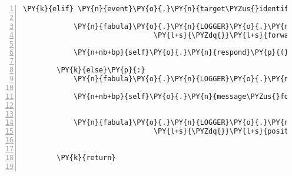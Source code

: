 \begin{Verbatim}[commandchars=\\\{\},numbers=left,firstnumber=1,stepnumber=1]
        \PY{k}{elif} \PY{n}{event}\PY{o}{.}\PY{n}{target\PYZus{}identifier} \PY{o+ow}{in} \PY{n+nb+bp}{self}\PY{o}{.}\PY{n}{host}\PY{o}{.}\PY{n}{rack}\PY{o}{.}\PY{n}{owner\PYZus{}dict}\PY{o}{.}\PY{n}{keys}\PY{p}{(}\PY{p}{)}\PY{p}{:}

            \PY{n}{fabula}\PY{o}{.}\PY{n}{LOGGER}\PY{o}{.}\PY{n}{info}\PY{p}{(}\PY{l+s}{\PYZdq{}}\PY{l+s}{\PYZsq{}}\PY{l+s}{\PYZob{}\PYZcb{}}\PY{l+s}{\PYZsq{}}\PY{l+s}{ dropped on Entity in rack }\PY{l+s}{\PYZsq{}}\PY{l+s}{\PYZob{}\PYZcb{}}\PY{l+s}{\PYZsq{}}\PY{l+s}{,}\PY{l+s}{\PYZdq{}}
                               \PY{l+s}{\PYZdq{}}\PY{l+s}{forwarding to respond()}\PY{l+s}{\PYZdq{}}\PY{o}{.}\PY{n}{format}\PY{p}{(}\PY{n}{event}\PY{o}{.}\PY{n}{item\PYZus{}identifier}\PY{p}{,}
                                                                \PY{n}{event}\PY{o}{.}\PY{n}{target\PYZus{}identifier}\PY{p}{)}\PY{p}{)}
            \PY{n+nb+bp}{self}\PY{o}{.}\PY{n}{respond}\PY{p}{(}\PY{n}{event}\PY{p}{)}

        \PY{k}{else}\PY{p}{:}
            \PY{n}{fabula}\PY{o}{.}\PY{n}{LOGGER}\PY{o}{.}\PY{n}{debug}\PY{p}{(}\PY{l+s}{\PYZdq{}}\PY{l+s}{target }\PY{l+s}{\PYZsq{}}\PY{l+s}{\PYZob{}\PYZcb{}}\PY{l+s}{\PYZsq{}}\PY{l+s}{ is not an entity identifier}\PY{l+s}{\PYZdq{}}\PY{o}{.}\PY{n}{format}\PY{p}{(}\PY{n}{event}\PY{o}{.}\PY{n}{target\PYZus{}identifier}\PY{p}{[}\PY{p}{:}\PY{l+m+mi}{2}\PY{p}{]}\PY{p}{)}\PY{p}{)}

            \PY{n+nb+bp}{self}\PY{o}{.}\PY{n}{message\PYZus{}for\PYZus{}host}\PY{o}{.}\PY{n}{event\PYZus{}list}\PY{o}{.}\PY{n}{append}\PY{p}{(}\PY{n}{fabula}\PY{o}{.}\PY{n}{PerceptionEvent}\PY{p}{(}\PY{n}{event}\PY{o}{.}\PY{n}{identifier}\PY{p}{,}
                                                                           \PY{l+s}{\PYZsq{}}\PY{l+s}{Das möchte ich hier nicht ablegen.}\PY{l+s}{\PYZsq{}}\PY{p}{)}\PY{p}{)}

            \PY{n}{fabula}\PY{o}{.}\PY{n}{LOGGER}\PY{o}{.}\PY{n}{info}\PY{p}{(}\PY{l+s}{\PYZdq{}}\PY{l+s}{PerceptionEvent: drop of }\PY{l+s}{\PYZsq{}}\PY{l+s}{\PYZob{}\PYZcb{}}\PY{l+s}{\PYZsq{}}\PY{l+s}{ on }\PY{l+s}{\PYZdq{}}
                               \PY{l+s}{\PYZdq{}}\PY{l+s}{position \PYZob{}\PYZcb{} is not desired}\PY{l+s}{\PYZdq{}}\PY{o}{.}\PY{n}{format}\PY{p}{(}\PY{n}{event}\PY{o}{.}\PY{n}{item\PYZus{}identifier}\PY{p}{,}
                                                                   \PY{n}{event}\PY{o}{.}\PY{n}{target\PYZus{}identifier}\PY{p}{[}\PY{p}{:}\PY{l+m+mi}{2}\PY{p}{]}\PY{p}{)}\PY{p}{)}

        \PY{k}{return}


\end{Verbatim}
